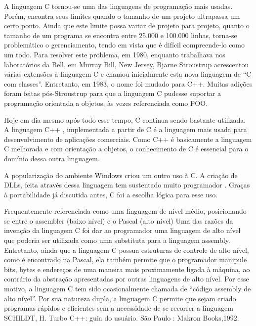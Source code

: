\documentclass[
    12pt,               %
    openright,          %
    twoside,            %
    a4paper,            %
    brazil              %
    ]{abntex2}
\begin{document}
A linguagem C tornou-se uma das linguagens de programação mais usadas. Porém, encontra seus 
limites quando o tamanho de um projeto ultrapassa um certo ponto. Ainda que este limite possa 
variar de projeto para projeto, quanto o tamanho de um programa se encontra entre 25.000 e 100.000 
linhas, torna-se problemático o gerenciamento, tendo em vista que é difícil compreende-lo como 
um todo. Para resolver este problema, em 1980, enquanto trabalhava nos laboratórios da Bell, 
em Murray Bill, New Jersey, Bjarne Stroustrup acrescentou várias extensões à linguagem C e chamou 
inicialmente esta nova linguagem de “C com classes”. Entretanto, em 1983, o nome foi mudado para C++. 
Muitas adições foram feitas pós-Stroustrup para que a linguagem C pudesse suportar a programação 
orientada a objetos, às vezes referenciada como POO.

Hoje em dia mesmo após todo esse tempo, C continua sendo bastante utilizada. A linguagem C++ , 
implementada a partir de C é a linguagem mais usada para desenvolvimento de aplicações comerciais. 
Como C++ é basicamente a linguagem C melhorada e com orientação a objetos, o conhecimento de C é 
essencial para o domínio dessa outra linguagem.

A popularização do ambiente Windows criou um outro uso à C. A criação de DLLs, feita através dessa 
linguagem tem sustentado muito programador . Graças à portabilidade já discutida antes, C foi a 
escolha lógica para esse uso.

Frequentemente referenciada como uma linguagem de nível médio, posicionando-se entre o assembler 
(baixo nível) e o Pascal (alto nível) Uma das razões da invenção da linguagem C foi dar ao programador 
uma linguagem de alto nível que poderia ser utilizada como uma substituta para a linguagem assembly. 
Entretanto, ainda que a linguagem C possua estruturas de controle de alto nível, como é encontrado na 
Pascal, ela também permite que o programador manipule bits, bytes e endereços de uma maneira mais 
proximamente ligada à máquina, ao contrário da abstração apresentadas por outras linguagens de alto 
nível. Por esse motivo, a linguagem C tem sido ocasionalmente chamada de “código assembly de alto 
nível”. Por sua natureza dupla, a linguagem C permite que sejam criado programas rápidos e eficientes 
sem a necessidade de se recorrer a linguagem SCHILDT, H. Turbo C++: guia do usuário. São Paulo : 
Makron Books,1992.
\end{document}
